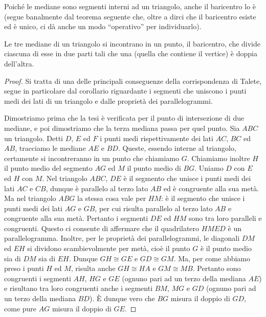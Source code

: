 Poiché le mediane sono segmenti interni ad un triangolo, anche il baricentro lo è (segue banalmente dal teorema seguente che, oltre a dirci che il baricentro esiste ed è unico, ci dà anche un modo ``operativo'' per individuarlo).

\begin{teorema}
Le tre mediane di un triangolo si incontrano in un punto, il baricentro, che divide ciascuna di esse in due parti tali che una (quella che contiene il vertice) è doppia dell'altra.
\end{teorema}

\begin{figure}[htb]
	\centering
\end{figure}

\begin{proof}
Si tratta di una delle principali conseguenze della corrispondenza di Talete, segue in particolare dal corollario riguardante i segmenti che uniscono i punti medi dei lati di un triangolo e dalle proprietà dei parallelogrammi.

Dimostriamo prima che la tesi è verificata per il punto di intersezione di due mediane, e poi dimostriamo che la terza mediana passa per quel punto.
Sia $ABC$ un triangolo. Detti $D$, $E$ ed $F$ i punti medi rispettivamente dei lati $AC$, $BC$ ed $AB$, tracciamo le mediane $AE$ e $BD$. Queste, essendo interne al triangolo, certamente si incontreranno in un punto che chiamiamo $G$. Chiamiamo inoltre $H$ il punto medio del segmento $AG$ ed $M$ il punto medio di $BG$. Uniamo $D$ con $E$ ed $H$ con $M$. Nel triangolo $ABC$, $DE$ è il segmento che unisce i punti medi dei lati $AC$ e $CB$, dunque è parallelo al terzo lato $AB$ ed è congruente alla sua metà. Ma nel triangolo $ABG$ la stessa cosa vale per $HM$: è il segmento che unisce i punti medi dei lati $AG$ e $GB$, per cui risulta parallelo al terzo lato $AB$ e congruente alla sua metà. Pertanto i segmenti $DE$ ed $HM$ sono tra loro paralleli e congruenti. Questo ci consente di affermare che il quadrilatero $HMED$ è un parallelogramma. Inoltre, per le proprietà dei parallelogrammi, le diagonali $DM$ ed $EH$ si dividono scambievolmente per metà, cioè il punto $G$ è il punto medio sia di $DM$ sia di $EH$. Dunque $GH\cong GE$ e $GD\cong GM$. Ma, per come abbiamo preso i punti $H$ ed $M$, risulta anche $GH\cong HA$ e $GM\cong MB$. Pertanto sono congruenti i segmenti $AH$, $HG$ e $GE$ (ognuno pari ad un terzo della mediana $AE$) e risultano tra loro congruenti anche i segmenti $BM$, $MG$ e $GD$ (ognuno pari ad un terzo della mediana $BD$). \`E dunque vero che $BG$ misura il doppio di $GD$, come pure $AG$ misura il doppio di $GE$.


\end{proof}
